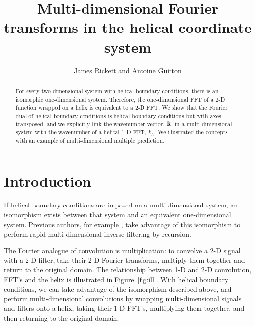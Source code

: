 \def\figdir{./Fig} 
\title{Multi-dimensional Fourier transforms in the helical coordinate 
system}  

\author{James Rickett and Antoine Guitton}

\maketitle

\begin{abstract}
For every two-dimensional system with helical boundary
conditions, there is an isomorphic one-dimensional system.
Therefore, the one-dimensional FFT of a 2-D function wrapped on a
helix is equivalent to a 2-D FFT.
We show that the Fourier dual of helical boundary conditions is
helical boundary conditions but with axes transposed, and we
explicitly link the wavenumber vector, ${\bf k}$, in a
multi-dimensional system with the wavenumber of a helical 1-D FFT,
$k_h$.   
We illustrated the concepts with an example of multi-dimensional
multiple prediction.
\end{abstract}  

\section{Introduction}

If helical boundary conditions \cite[]{geofizhelix} are imposed on a
multi-dimensional system, an isomorphism exists between that system
and an equivalent one-dimensional system.  
Previous authors, for example \cite{gee}, take advantage of
this isomorphism to perform rapid multi-dimensional inverse filtering
by recursion. 

\par
The Fourier analogue of convolution is multiplication: to convolve a
2-D signal with a 2-D filter, take their 2-D Fourier transforms,
multiply them together and return to the original domain.
The relationship between 1-D and 2-D convolution, FFT's and the helix
is illustrated in Figure~\ref{fig:ill}.
With helical boundary conditions, we can take advantage of the
isomorphism described above, and perform multi-dimensional
convolutions by wrapping multi-dimensional signals and filters onto a
helix, taking their 1-D FFT's, multiplying them together, and then
returning to the original domain.


